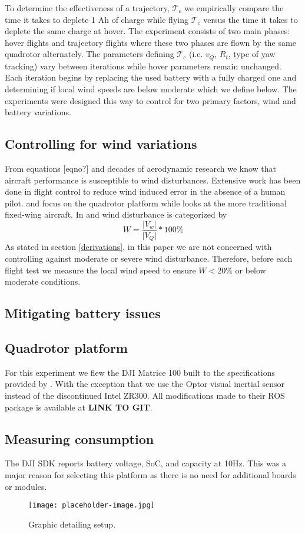 
To determine the effectiveness of a trajectory, $\mathscr{T}_c$ we empirically compare the time it takes to deplete 1 Ah of charge while flying $\mathscr{T}_c$ versus the time it takes to deplete the same charge at hover. The experiment consists of two main phases: hover flights and trajectory flights where these two phases are flown by the same quadrotor alternately. The parameters defining $\mathscr{T}_c$ (i.e. $v_Q$, $R_t$, type of yaw tracking) vary between iterations while hover parameters remain unchanged. Each iteration begins by replacing the used battery with a fully charged one and determining if local wind speeds are below moderate which we define below. The experiments were designed this way to control for two primary factors, wind and battery variations.

\subsection{Controlling for wind variations}
From equations [eqno?] and decades of aerodynamic research we know that aircraft performance is susceptible to wind disturbances. Extensive work has been done in flight control to reduce wind induced error in the absence of a human pilot. \cite{escareno2013trajectory} and \cite{waslander2009wind} focus on the quadrotor platform while \cite{mcgee2006path} looks at the more traditional fixed-wing aircraft.
In \cite{escareno2013trajectory} and \cite{mcgee2006path} wind disturbance is categorized by 
\begin{equation}
    W = \frac{\lvert V_w \rvert}{\lvert V_Q \rvert}*100\%
\end{equation}
As stated in section \ref{derivations}, in this paper we are not concerned with controlling against moderate or severe wind disturbance. Therefore, before each flight test we measure the local wind speed to ensure $W<20\%$ or below moderate conditions.

\subsection{Mitigating battery issues}


\subsection{Quadrotor platform}
For this experiment we flew the DJI Matrice 100 built to the specifications provided by \cite{sa2018dynamic}. With the exception that we use the Optor visual inertial sensor instead of the discontinued Intel ZR300. All modifications made to their ROS package is available at \textbf{LINK TO GIT}.

\subsection{Measuring consumption}
The DJI SDK reports battery voltage, SoC, and capacity at 10Hz. This was a major reason for selecting this platform as there is no need for additional boards or modules.

\begin{figure}[ht]
	\centering
	\texttt{[image: placeholder-image.jpg]}
	\caption{Graphic detailing setup.}
\end{figure}
